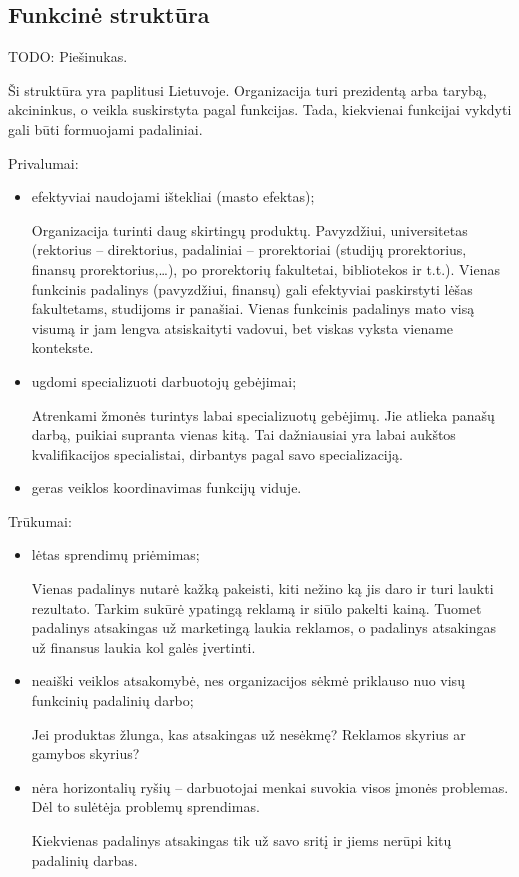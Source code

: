 \subsection{Funkcinė struktūra}

TODO: Piešinukas.

Ši struktūra yra paplitusi Lietuvoje. Organizacija turi prezidentą arba
tarybą, akcininkus, o veikla suskirstyta pagal funkcijas. Tada,
kiekvienai funkcijai vykdyti gali būti formuojami padaliniai.

Privalumai:
\begin{itemize}
  \item efektyviai naudojami ištekliai (masto efektas);
    \begin{note}
      Organizacija turinti daug skirtingų produktų. Pavyzdžiui,
      universitetas (rektorius – direktorius, padaliniai – prorektoriai
      (studijų prorektorius, finansų prorektorius,…), po prorektorių
      fakultetai, bibliotekos ir t.t.). Vienas funkcinis padalinys
      (pavyzdžiui, finansų) gali efektyviai paskirstyti lėšas fakultetams,
      studijoms ir panašiai. Vienas funkcinis padalinys mato visą
      visumą ir jam lengva atsiskaityti vadovui, bet viskas vyksta
      viename kontekste.
    \end{note}
  \item ugdomi specializuoti darbuotojų gebėjimai;
    \begin{note}
      Atrenkami žmonės turintys labai specializuotų gebėjimų. Jie
      atlieka panašų darbą, puikiai supranta vienas kitą. Tai
      dažniausiai yra labai aukštos kvalifikacijos specialistai,
      dirbantys pagal savo specializaciją.
    \end{note}
  \item geras veiklos koordinavimas funkcijų viduje.
\end{itemize}

Trūkumai:
\begin{itemize}
  \item lėtas sprendimų priėmimas;
    \begin{exmp}
      Vienas padalinys nutarė kažką pakeisti, kiti nežino ką jis daro
      ir turi laukti rezultato. Tarkim sukūrė ypatingą reklamą ir siūlo
      pakelti kainą. Tuomet padalinys atsakingas už marketingą laukia
      reklamos, o padalinys atsakingas už finansus laukia kol galės
      įvertinti.
    \end{exmp}
  \item neaiški veiklos atsakomybė, nes organizacijos sėkmė priklauso
    nuo visų funkcinių padalinių darbo;
    \begin{exmp}
      Jei produktas žlunga, kas atsakingas už nesėkmę? Reklamos skyrius
      ar gamybos skyrius?
    \end{exmp}
  \item nėra horizontalių ryšių – darbuotojai menkai suvokia visos
    įmonės problemas. Dėl to sulėtėja problemų sprendimas.
    \begin{note}
      Kiekvienas padalinys atsakingas tik už savo sritį ir jiems
      nerūpi kitų padalinių darbas.
    \end{note}
\end{itemize}

